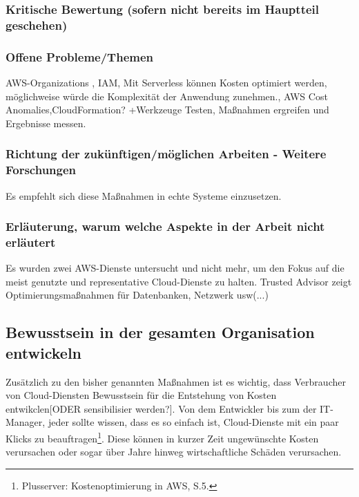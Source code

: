 \subsubsection*{Kritische Bewertung (sofern nicht bereits im Hauptteil geschehen)}
\subsubsection*{Offene Probleme/Themen}
AWS-Organizations%
, IAM, Mit Serverless können Kosten optimiert werden, möglichweise würde die Komplexität der Anwendung zunehmen.,  AWS Cost Anomalies,CloudFormation?
+Werkzeuge Testen, Maßnahmen ergreifen und Ergebnisse messen.
\subsubsection*{Richtung der zukünftigen/möglichen Arbeiten - Weitere Forschungen}
Es empfehlt sich diese Maßnahmen in echte Systeme einzusetzen.
\subsubsection*{Erläuterung, warum welche Aspekte in der Arbeit nicht erläutert} 
Es wurden zwei AWS-Dienste untersucht und nicht mehr, um den Fokus auf die meist genutzte und representative Cloud-Dienste zu halten. Trusted Advisor zeigt Optimierungsmaßnahmen für Datenbanken, Netzwerk usw(...) 

\subsection*{Bewusstsein in der gesamten Organisation entwickeln}
Zusätzlich zu den bisher genannten Maßnahmen ist es wichtig, dass Verbraucher von Cloud-Diensten Bewusstsein für die Entstehung von Kosten entwikclen[ODER sensibilisier werden?]. Von dem Entwickler bis zum der IT-Manager, jeder sollte wissen, dass es so einfach ist, Cloud-Dienste mit ein paar Klicks zu beauftragen\footnote{Plusserver: Kostenoptimierung in AWS, S.5\cite{PS1}.}. Diese können in kurzer Zeit ungewünschte  Kosten verursachen oder sogar über Jahre hinweg wirtschaftliche Schäden verursachen. 
\\

